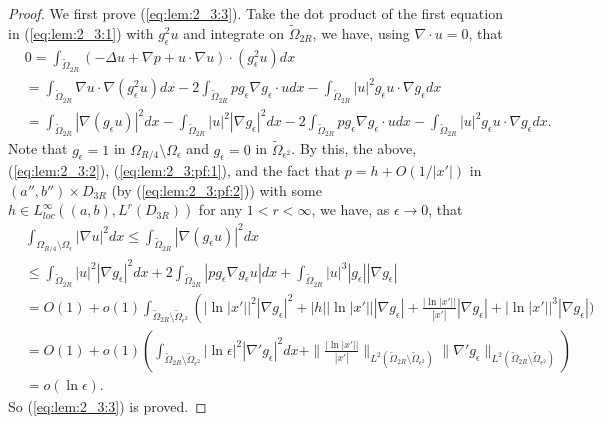 \documentclass[12pt]{article}
\begin{document}
\begin{proof}
	We first prove (\ref{eq:lem:2_3:3}). Take the dot product of the first equation in (\ref{eq:lem:2_3:1}) with $g_{\epsilon}^2u$ and integrate on $\tilde{\Omega}_{2R}$, we have, using $\nabla \cdot u=0$, that 
	\[
	\begin{split}
		& 0=\int_{\tilde{\Omega}_{2R}}(-\Delta u+\nabla p+u\cdot \nabla u)\cdot (g^2_{\epsilon}u) dx\\
		&=\int_{\tilde{\Omega}_{2R}}\nabla u\cdot \nabla (g^2_{\epsilon}u)dx-2\int_{\tilde{\Omega}_{2R}}p g_{\epsilon} \nabla g_{\epsilon}\cdot udx-\int_{\tilde{\Omega}_{2R}}|u|^2g_{\epsilon}u\cdot \nabla g_{\epsilon}dx\\
		&=\int_{\tilde{\Omega}_{2R}}|\nabla (g_{\epsilon}u)|^2dx-\int_{\tilde{\Omega}_{2R}}|u|^2|\nabla g_{\epsilon}|^2 dx-2\int_{\tilde{\Omega}_{2R}}p g_{\epsilon} \nabla g_{\epsilon}\cdot udx-\int_{\tilde{\Omega}_{2R}}|u|^2g_{\epsilon}u\cdot \nabla g_{\epsilon}dx.
	\end{split}
	\]
	Note that $g_{\epsilon}=1$ in $\Omega_{R/4}\setminus\Omega_{\epsilon}$ and $g_{\epsilon}=0$ in $\tilde{\Omega}_{\epsilon^2}$. By this, the above, (\ref{eq:lem:2_3:2}), (\ref{eq:lem:2_3:pf:1}), and the fact that $p=h+O\left(1/|x'|\right)$ in $(a'', b'')\times D_{3R}$ (by (\ref{eq:lem:2_3:pf:2})) with some $h\in L^{\infty}_{loc}((a, b), L^{r}(D_{3R}))$ for any $1<r<\infty$, we have, as $\epsilon\to 0$, that
	\[
	\begin{split}
		& \int_{\Omega_{R/4}\setminus\Omega_{\epsilon}}|\nabla u|^2dx 
		\le \int_{\tilde{\Omega}_{2R}}|\nabla (g_{\epsilon}u)|^2dx\\
		& \le \int_{\tilde{\Omega}_{2R}}|u|^2|\nabla g_{\epsilon}|^2 dx+2\int_{\tilde{\Omega}_{2R}}|p g_{\epsilon} \nabla g_{\epsilon}u|dx+\int_{\tilde{\Omega}_{2R}}|u|^3|g_{\epsilon}| |\nabla g_{\epsilon}|\\
		& = O(1)+o(1)\int_{\tilde{\Omega}_{2R}\setminus\tilde{\Omega}_{\epsilon^2}}\left(| \ln |x'| |^2|\nabla g_{\epsilon}|^2 +|h| | \ln |x'|||\nabla g_{\epsilon}| \right.
		+\frac{| \ln |x'||}{|x'|} |\nabla g_{\epsilon}|+| \ln |x'| |^3|\nabla g_{\epsilon}|)\\
		& = O(1)+o(1)
		\left( \int_{ \tilde{\Omega}_{2R} \setminus \tilde{\Omega}_{\epsilon^2} } | \ln \epsilon |^2 |\nabla' g_{\epsilon} |^2 dx 
		+ \| \frac{| \ln |x'|| }{ |x'| } \|_{ L^2 ( \tilde{\Omega}_{2R} \setminus \tilde{\Omega}_{\epsilon^2} ) } \| \nabla' g_{\epsilon} \|_{ L^2 ( \tilde{\Omega}_{2R} \setminus \tilde{\Omega}_{\epsilon^2} ) } \right) \\
		& = o ( \ln \epsilon).
	\end{split}
	\]
	So (\ref{eq:lem:2_3:3}) is proved.
 

\end{proof}
\end{document}
